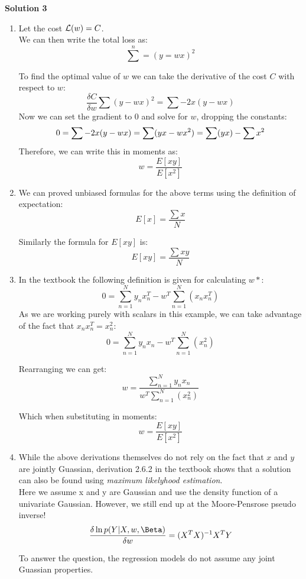 \documentclass[submit]{harvardml}
\begin{document}
\newpage
\textbf{Solution 3}
\begin{enumerate}
    \item Let the cost $\mathcal{L}(w) = C$.\\
    We can then write the total loss as: 
    $$
    \sum^n = (y = wx)^2
    $$
    
    To find the optimal value of $w$ we can take the derivative of the cost $C$ with respect to $w$:
    $$
        \frac{\delta C}{\delta w} \sum (y - wx)^2
        = \sum -2x(y - wx)  
    $$
    Now we can set the gradient to 0 and solve for $w$, dropping the constants:
    $$
        0 = \sum -2x(y - wx) = \sum (yx - wx^2)  \\
        = \sum (yx) - \sum x^2 
    $$
    Therefore, we can write this in moments as:
    $$
        w =\frac{E [xy]}{E [x^2]}
    $$
    
    \item We can proved unbiased formulas for the above terms using the definition of expectation: \\
    
    $$
        E[x] = \frac{\sum x}{N}
    $$
    
    Similarly the formula for $E[xy]$ is:
    $$
        E[xy] = \frac{\sum xy}{N}
    $$
    
    \item In the textbook the following definition is given for calculating $w*$:
    $$
        0 =  \sum^N_{n=1} y_n x^T_n - w^T\sum^N_{n=1} (x_n x^T_n)
    $$
    As we are working purely with scalars in this example, we can take advantage of the fact that $x_n x_n^T = x_n^2$:
    $$
        0 = \sum^N_{n=1} y_n x_n - w^T\sum^N_{n=1} (x_n^2)
    $$
    
    Rearranging we can get:
    $$
        w = \frac{\sum^N_{n=1} y_n x_n}{w^T\sum^N_{n=1} (x_n^2)}
    $$
    
    Which when substituting in moments:
    $$
        w =\frac{E [xy]}{E [x^2]}
    $$
    
    \item While the above derivations themselves do not rely on the fact that $x$ and $y$ are jointly Guassian, derivation 2.6.2 in the textbook shows that a solution can also be found using \textit{maximum likelyhood estimation}. \\
    Here we assume x and y are Gaussian and use the density function of a univariate Gaussian. However, we still end up at the Moore-Pensrose pseudo inverse!
    $$
        \frac{\delta \ln{ p(Y|X,w,\Beta) } }{\delta w} = (X^TX)^{-1}X^TY
    $$
    
    To answer the question, the regression models do not assume any joint Guassian properties.
\end{enumerate}
\end{document}
